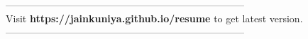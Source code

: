 \documentclass[a4paper]{deedy-resume} %
\begin{document}
\begin{minipage}[t]{0.33\textwidth}
    \sectionspace %
    \sectionspace %
    \sectionspace %
    ------------------------------------------------------------------------\\
    Visit {\bf https://jainkuniya.github.io/resume} to get latest version.\\
    ------------------------------------------------------------------------\\
    \end{minipage} %
    \hfill
\end{document}
